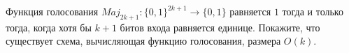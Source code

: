 Функция голосования $Maj_{2k + 1}: \{0, 1\}^{2k + 1} \to \{0, 1\}$ равняется $1$ тогда и только тогда, когда хотя бы $k + 1$
битов входа равняется единице. Покажите, что существует схема, вычисляющая функцию голосования, размера $O(k)$.